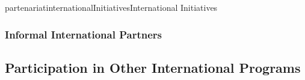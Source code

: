 \documentclass{ra2018}
\begin{document}
\begin{module}{partenariat}{internationalInitiatives}{International Initiatives}
%




        \subsubsection{Informal International Partners}
        


\subsection{Participation in Other International Programs}




\end{module}
\end{document}
